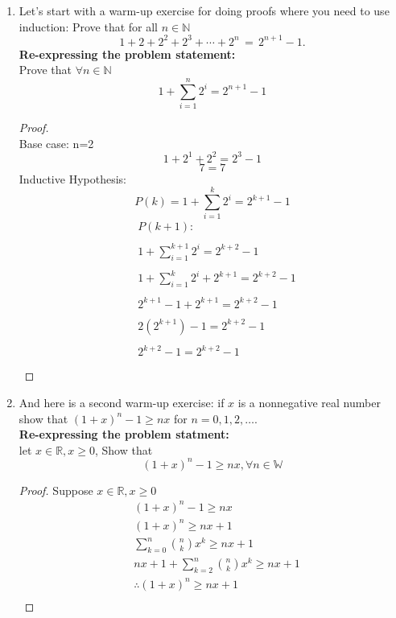 \documentclass[11pt]{article}
\theoremstyle{definition}  %
\newcommand{\N}{\mathbb{N}}
\newcommand{\R}{\mathbb{R}}
\begin{document}

\begin{enumerate}

\item Let's start with a warm-up exercise for doing proofs where you need to use induction:  Prove that for all $n \in \N$
  $$ 1 + 2 + 2^2 + 2^3 + \cdots + 2^n \, = \, 2^{n+1} - 1.$$
  \textbf{Re-expressing the problem statement: }\\
  Prove that $\forall n \in \N$
  \[
    1+\sum_{i=1}^n2^i=2^{n+1}-1
  \]
  \begin{proof}\\
    Base case: n=2\\
    $$1+2^1+2^2=2^3-1$$
    $$7=7$$
    Inductive Hypothesis: \\
    $$P(k)=  1+\sum_{i=1}^k2^i=2^{k+1}-1$$
    \begin{align*}
      &P(k+1):\\\\
      &1+\sum_{i=1}^{k+1}2^i=2^{k+2}-1\\\\
      &1+\sum_{i=1}^{k}2^i+2^{k+1}=2^{k+2}-1\\\\
      &2^{k+1}-1+2^{k+1}=2^{k+2}-1\\\\
        &2(2^{k+1})-1=2^{k+2}-1\\\\
          &2^{k+2}-1=2^{k+2}-1\\\\
    \end{align*}
  \end{proof}
\item And here is a second warm-up exercise: if $x$ is a nonnegative real number show that $(1 + x)^n - 1 \geq nx$ for $n=0, 1, 2, \ldots$.\\
\textbf{Re-expressing the problem statment:}\\
let $x\in \R, x\geq 0$, Show that
\[
  (1 + x)^n - 1 \geq nx, \forall n \in \mathbb{W}
\]
\begin{proof}
  Suppose  $x\in \R, x\geq 0$
\begin{align*}
  &(1 + x)^n - 1 \geq nx\\
  &(1 + x)^n\geq nx+1\\
  &\sum_{k=0}^n\binom{n}{k}x^k\geq nx+1\\
  &nx+1+\sum_{k=2}^n\binom{n}{k}x^k\geq nx+1\\
  &\therefore (1 + x)^n\geq nx+1\\

\end{align*}
\end{proof}
\end{enumerate}
\end{document}
